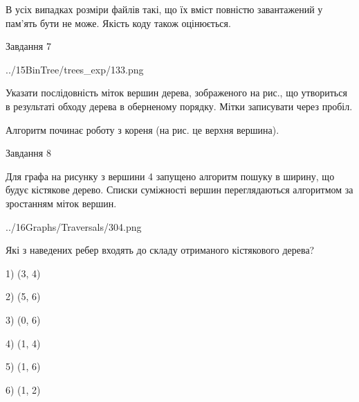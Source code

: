 \documentclass[12pt, ukrainian]{article}
\begin{document}
{В усіх випадках розміри файлів такі, що їх вміст повністю завантажений у пам'ять бути не може. Якість коду також оцінюється.



\vspace{10mm}\par

\newpage
\begin{minipage}[t]{9.7cm}
               
{\begin{center}Завдання {7}\end{center}}
\vspace{-4mm}

\begin{center}
	{../15BinTree/trees_exp/133.png}
\end{center}
Указати послідовність міток вершин дерева, зображеного на рис., що утвориться в результаті обходу дерева в оберненому порядку. Мітки записувати через пробіл.\par Алгоритм починає роботу з кореня (на рис. це верхня вершина).\par

\end{minipage}
\vline \hspace{8mm}
\begin{minipage}[t]{8.0cm}
               
{\begin{center}Завдання {8}\end{center}}
\vspace{-4mm}
Для графа на рисунку з вершини 4 запущено алгоритм пошуку в ширину, що будує кістякове дерево. Списки суміжності вершин переглядаються алгоритмом за зростанням міток вершин.\par
\begin{center}
	{../16Graphs/Traversals/304.png}
\end{center}
\par Які з наведених ребер входять до складу отриманого кістякового дерева?\par
1) (3, 4)\par
2) (5, 6)\par
3) (0, 6)\par
4) (1, 4)\par
5) (1, 6)\par
6) (1, 2)\par
{\vskip 15pt} \par


\end{minipage}}
\end{document}
